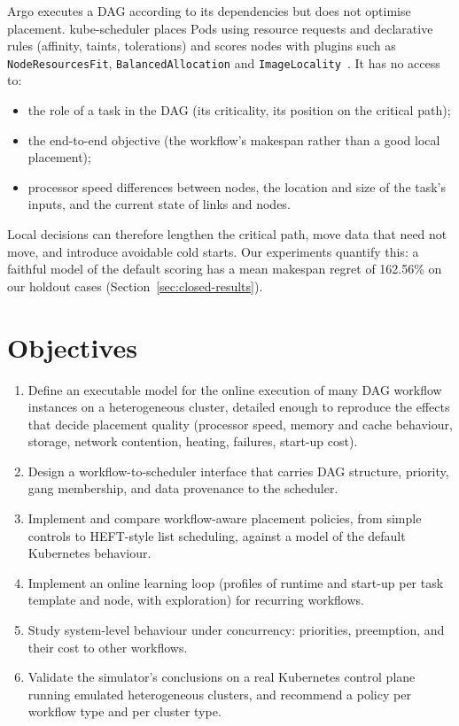 \documentclass[12pt,a4paper]{report}
\begin{document}
Argo executes a DAG according to its dependencies but does not optimise
placement. kube-scheduler places Pods using resource requests and
declarative rules (affinity, taints, tolerations) and scores nodes with
plugins such as \texttt{NodeResourcesFit}, \texttt{BalancedAllocation} and
\texttt{ImageLocality}~\cite{kubernetes-config}. It has no access to:

\begin{itemize}
\item the role of a task in the DAG (its criticality, its position on the
      critical path);
\item the end-to-end objective (the workflow's makespan rather than a good
      local placement);
\item processor speed differences between nodes, the location and size of
      the task's inputs, and the current state of links and nodes.
\end{itemize}

Local decisions can therefore lengthen the critical path, move data that
need not move, and introduce avoidable cold starts. Our experiments
quantify this: a faithful model of the default scoring has a mean makespan
regret of 162.56\% on our holdout cases (Section~\ref{sec:closed-results}).

\section{Objectives}

\begin{enumerate}
\item Define an executable model for the online execution of many DAG
      workflow instances on a heterogeneous cluster, detailed enough to
      reproduce the effects that decide placement quality (processor speed,
      memory and cache behaviour, storage, network contention, heating,
      failures, start-up cost).
\item Design a workflow-to-scheduler interface that carries DAG structure,
      priority, gang membership, and data provenance to the scheduler.
\item Implement and compare workflow-aware placement policies, from simple
      controls to HEFT-style list scheduling, against a model of the
      default Kubernetes behaviour.
\item Implement an online learning loop (profiles of runtime and start-up
      per task template and node, with exploration) for recurring
      workflows.
\item Study system-level behaviour under concurrency: priorities,
      preemption, and their cost to other workflows.
\item Validate the simulator's conclusions on a real Kubernetes control
      plane running emulated heterogeneous clusters, and recommend a
      policy per workflow type and per cluster type.
\end{enumerate}
\end{document}
